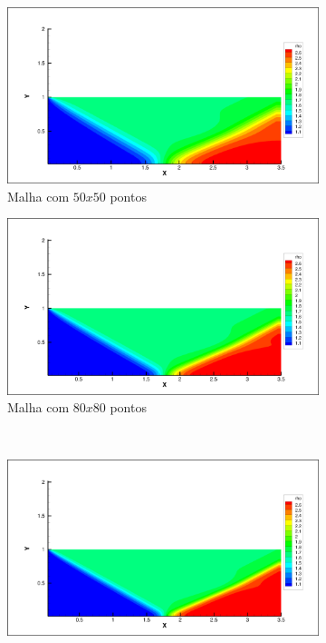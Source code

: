 \documentclass[a4paper, twoside, 12pt]{article}
\numberwithin{equation}{section}
\begin{document}
        \begin{figure}[H]

            \begin{subfigure}{.5\textwidth}
            \centering
            \includegraphics[width=.9\linewidth]{pics/rho_5050.png}
            \caption{Malha com $50x50$ pontos}
            \label{fig:sfig1}
            \end{subfigure}%
            \begin{subfigure}{.5\textwidth}
            \centering
            \includegraphics[width=.9\linewidth]{pics/rho_8080.png}
            \caption{Malha com $80x80$ pontos}
            \label{fig:sfig2}
            \end{subfigure}
            \\
            \begin{subfigure}{.5\textwidth}
            \centering
            \includegraphics[width=.9\linewidth]{pics/rho_110110.png}

\end{subfigure}
\end{figure}
\end{document}
